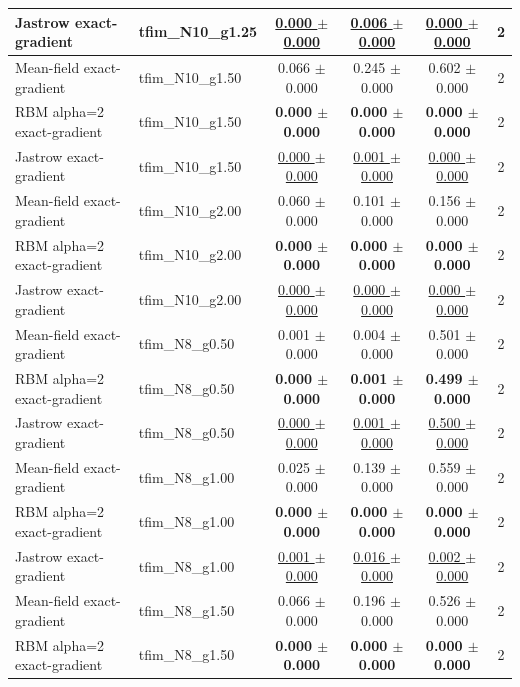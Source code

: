 \begin{tabular}{llcccc}
Jastrow exact-gradient & tfim\_N10\_g1.25 & \underline{0.000 $\pm$ 0.000} & \underline{0.006 $\pm$ 0.000} & \underline{0.000 $\pm$ 0.000} & 2 \\
\midrule
Mean-field exact-gradient & tfim\_N10\_g1.50 & 0.066 $\pm$ 0.000 & 0.245 $\pm$ 0.000 & 0.602 $\pm$ 0.000 & 2 \\
RBM alpha=2 exact-gradient & tfim\_N10\_g1.50 & \textbf{0.000 $\pm$ 0.000} & \textbf{0.000 $\pm$ 0.000} & \textbf{0.000 $\pm$ 0.000} & 2 \\
Jastrow exact-gradient & tfim\_N10\_g1.50 & \underline{0.000 $\pm$ 0.000} & \underline{0.001 $\pm$ 0.000} & \underline{0.000 $\pm$ 0.000} & 2 \\
\midrule
Mean-field exact-gradient & tfim\_N10\_g2.00 & 0.060 $\pm$ 0.000 & 0.101 $\pm$ 0.000 & 0.156 $\pm$ 0.000 & 2 \\
RBM alpha=2 exact-gradient & tfim\_N10\_g2.00 & \textbf{0.000 $\pm$ 0.000} & \textbf{0.000 $\pm$ 0.000} & \textbf{0.000 $\pm$ 0.000} & 2 \\
Jastrow exact-gradient & tfim\_N10\_g2.00 & \underline{0.000 $\pm$ 0.000} & \underline{0.000 $\pm$ 0.000} & \underline{0.000 $\pm$ 0.000} & 2 \\
\midrule
Mean-field exact-gradient & tfim\_N8\_g0.50 & 0.001 $\pm$ 0.000 & 0.004 $\pm$ 0.000 & 0.501 $\pm$ 0.000 & 2 \\
RBM alpha=2 exact-gradient & tfim\_N8\_g0.50 & \textbf{0.000 $\pm$ 0.000} & \textbf{0.001 $\pm$ 0.000} & \textbf{0.499 $\pm$ 0.000} & 2 \\
Jastrow exact-gradient & tfim\_N8\_g0.50 & \underline{0.000 $\pm$ 0.000} & \underline{0.001 $\pm$ 0.000} & \underline{0.500 $\pm$ 0.000} & 2 \\
\midrule
Mean-field exact-gradient & tfim\_N8\_g1.00 & 0.025 $\pm$ 0.000 & 0.139 $\pm$ 0.000 & 0.559 $\pm$ 0.000 & 2 \\
RBM alpha=2 exact-gradient & tfim\_N8\_g1.00 & \textbf{0.000 $\pm$ 0.000} & \textbf{0.000 $\pm$ 0.000} & \textbf{0.000 $\pm$ 0.000} & 2 \\
Jastrow exact-gradient & tfim\_N8\_g1.00 & \underline{0.001 $\pm$ 0.000} & \underline{0.016 $\pm$ 0.000} & \underline{0.002 $\pm$ 0.000} & 2 \\
\midrule
Mean-field exact-gradient & tfim\_N8\_g1.50 & 0.066 $\pm$ 0.000 & 0.196 $\pm$ 0.000 & 0.526 $\pm$ 0.000 & 2 \\
RBM alpha=2 exact-gradient & tfim\_N8\_g1.50 & \textbf{0.000 $\pm$ 0.000} & \textbf{0.000 $\pm$ 0.000} & \textbf{0.000 $\pm$ 0.000} & 2 \\

\end{tabular}
